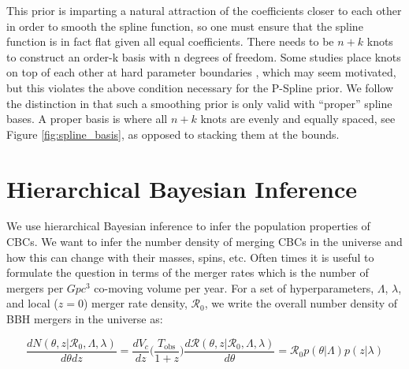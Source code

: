 This prior is imparting a natural attraction of the coefficients closer to each other in order to smooth the spline function, so one 
must ensure that the spline function is in fact flat given all equal coefficients. There needs to be $n+k$ knots to construct an order-k 
basis with n degrees of freedom. Some studies place knots on top of each other at hard parameter boundaries \citep{deBoor78,monotone_regression_splines}, 
which may seem motivated, but this violates the above condition necessary for the P-Spline prior. We follow the distinction in \citet{eilers2021practical} 
that such a smoothing prior is only valid with ``proper'' spline bases. A proper basis is where all $n+k$ knots are evenly and equally spaced, 
see Figure \ref{fig:spline_basis}, as opposed to stacking them at the bounds.

\section{Hierarchical Bayesian Inference} \label{sec:hierarchical_inference}

We use hierarchical Bayesian inference to infer the population properties of CBCs. We want to infer the number density of merging CBCs 
in the universe and how this can change with their masses, spins, etc. Often times it is useful to formulate the question in terms of the 
merger rates which is the number of mergers per $Gpc^{3}$ co-moving volume per year. For a set of hyperparameters, $\Lambda$, $\lambda$, and local ($z=0$) 
merger rate density, $\mathcal{R}_0$, we write the overall number density of BBH mergers in the universe as: 

\begin{equation} \label{number_density}
     \frac{dN(\theta, z | \mathcal{R}_0, \Lambda, \lambda)}{d\theta dz} = \frac{dV_c}{dz}\bigg(\frac{T_\mathrm{obs}}{1+z}\bigg) \frac{d\mathcal{R}(\theta, z | \mathcal{R}_0, \Lambda, \lambda)}{d\theta} = \mathcal{R}_0 p(\theta | \Lambda) p(z | \lambda)
\end{equation}

